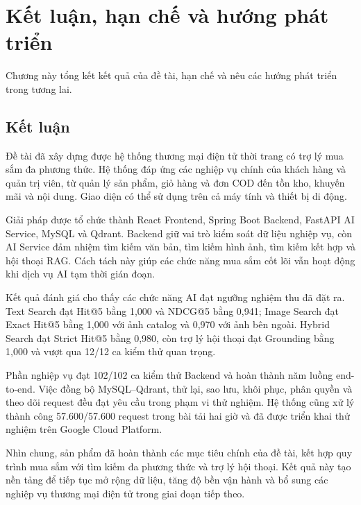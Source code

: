 
\section{Kết luận, hạn chế và hướng phát triển}

Chương này tổng kết kết quả của đề tài, hạn chế và nêu các hướng phát triển trong tương lai.

\subsection{Kết luận}

Đề tài đã xây dựng được hệ thống thương mại điện tử thời trang có trợ lý mua sắm đa phương thức. Hệ thống đáp ứng các nghiệp vụ chính của khách hàng và quản trị viên, từ quản lý sản phẩm, giỏ hàng và đơn COD đến tồn kho, khuyến mãi và nội dung. Giao diện có thể sử dụng trên cả máy tính và thiết bị di động.

Giải pháp được tổ chức thành React Frontend, Spring Boot Backend, FastAPI AI Service, MySQL và Qdrant. Backend giữ vai trò kiểm soát dữ liệu nghiệp vụ, còn AI Service đảm nhiệm tìm kiếm văn bản, tìm kiếm hình ảnh, tìm kiếm kết hợp và hội thoại RAG. Cách tách này giúp các chức năng mua sắm cốt lõi vẫn hoạt động khi dịch vụ AI tạm thời gián đoạn.

Kết quả đánh giá cho thấy các chức năng AI đạt ngưỡng nghiệm thu đã đặt ra. Text Search đạt Hit@5 bằng 1,000 và NDCG@5 bằng 0,941; Image Search đạt Exact Hit@5 bằng 1,000 với ảnh catalog và 0,970 với ảnh bên ngoài. Hybrid Search đạt Strict Hit@5 bằng 0,980, còn trợ lý hội thoại đạt Grounding bằng 1,000 và vượt qua 12/12 ca kiểm thử quan trọng.

Phần nghiệp vụ đạt 102/102 ca kiểm thử Backend và hoàn thành năm luồng end-to-end. Việc đồng bộ MySQL--Qdrant, thử lại, sao lưu, khôi phục, phân quyền và theo dõi request đều đạt yêu cầu trong phạm vi thử nghiệm. Hệ thống cũng xử lý thành công 57.600/57.600 request trong bài tải hai giờ và đã được triển khai thử nghiệm trên Google Cloud Platform.

Nhìn chung, sản phẩm đã hoàn thành các mục tiêu chính của đề tài, kết hợp quy trình mua sắm với tìm kiếm đa phương thức và trợ lý hội thoại. Kết quả này tạo nền tảng để tiếp tục mở rộng dữ liệu, tăng độ bền vận hành và bổ sung các nghiệp vụ thương mại điện tử trong giai đoạn tiếp theo.


